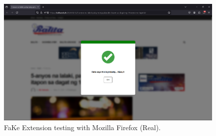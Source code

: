             \begin{figure}[h!]
                \centering
                \includegraphics[width=1\textwidth,height=1\textheight, keepaspectratio]{figures/Screenshots/firefox-real.png}
                    \caption{FaKe Extension testing with Mozilla Firefox (Real).}
                    \label{fig:real-firefox-test}
                \end{figure}

